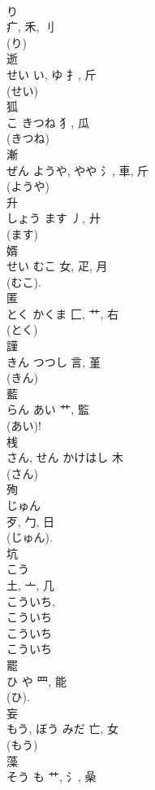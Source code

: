 \documentclass[8pt]{extreport}
\begin{document}
\begin{CJK}{UTF8}{min}
\\	り	
\\	疒, 禾, 刂	
\\	(り) 
\\	逝	
\\	せい	い, ゆ	扌, 斤		
\\	(せい) 
\\	狐	
\\	こ	きつね	犭, 瓜	
\\	(きつね) 
\\	漸	
\\	ぜん	ようや, やや	氵, 車, 斤	
\\	(ようや) 
\\	升	
\\	しょう	ます	丿, 廾	
\\	(ます) 
\\	婿	
\\	せい	むこ	女, 疋, 月	
\\	(むこ). 
\\	匿	
\\	とく	かくま	匚, 艹, 右	
\\	(とく) 
\\	謹	
\\	きん	つつし	言, 堇	
\\	(きん) 
\\	藍	
\\	らん	あい	艹, 監	
\\	(あい)! 
\\	桟	
\\	さん, せん	かけはし	木		
\\	(さん) 
\\	殉	
\\	じゅん	
\\	歹, 勹, 日	
\\	(じゅん). 
\\	坑	
\\	こう	
\\	土, 亠, 几	
\\	こういち, 
\\	こういち 
\\	こういち
\\	こういち 
\\	罷	
\\	ひ	や	罒, 能	
\\	(ひ). 
\\	妄	
\\	もう, ぼう	みだ	亡, 女	
\\	(もう) 
\\	藻	
\\	そう	も	艹, 氵, 喿	

\end{CJK}
\end{document}
